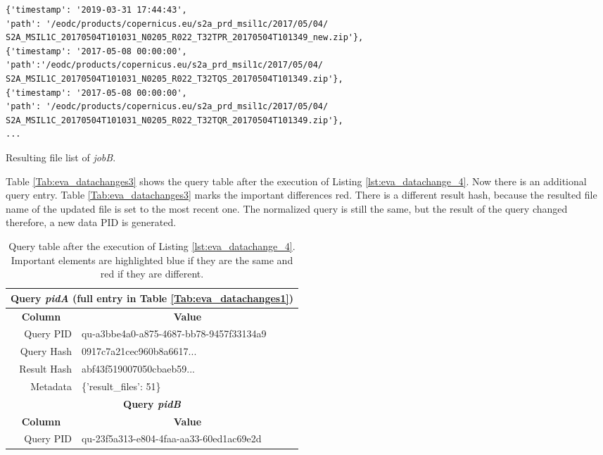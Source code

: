 \documentclass[draft,final]{vutinfth} %
\newenvironment{code}{\captionsetup{type=listing}}{}
\newcommand{\bgoesswein}[1]{{\color{blue}#1}}
\begin{document}
\begin{enumerate}
	\begin{code}
		\begin{verbatim}
{'timestamp': '2019-03-31 17:44:43', 
'path': '/eodc/products/copernicus.eu/s2a_prd_msil1c/2017/05/04/
S2A_MSIL1C_20170504T101031_N0205_R022_T32TPR_20170504T101349_new.zip'}, 
{'timestamp': '2017-05-08 00:00:00',
'path':'/eodc/products/copernicus.eu/s2a_prd_msil1c/2017/05/04/
S2A_MSIL1C_20170504T101031_N0205_R022_T32TQS_20170504T101349.zip'}, 
{'timestamp': '2017-05-08 00:00:00', 
'path': '/eodc/products/copernicus.eu/s2a_prd_msil1c/2017/05/04/
S2A_MSIL1C_20170504T101031_N0205_R022_T32TQR_20170504T101349.zip'}, 
...
		\end{verbatim}
		\caption{Resulting file list of \textit{jobB}.}
		\label{lst:eva_datachange_fl3}
	\end{code}
	\newpage
	Table \ref{Tab:eva_datachanges3} shows the query table after the execution of Listing \ref{lst:eva_datachange_4}. Now there is an additional query entry. Table \ref{Tab:eva_datachanges3} marks the important differences red. There is a different result hash, because the \bgoesswein{resulted file name of the updated file is set to the most recent one}. The normalized query is still the same, but the result of the query changed therefore, a new data PID is generated. 
	\begin{table}[]
		\caption{Query table after the execution of Listing \ref{lst:eva_datachange_4}. Important elements are highlighted blue if they are the same and red if they are different.}
		\centering
		\begin{tabular}{|r|l|}
			\hline \multicolumn{2}{|c|}{\textbf{Query \textit{pidA} (full entry in Table \ref{Tab:eva_datachanges1})}} \\
			\hline \multicolumn{1}{|c|}{\textbf{Column}}  &  \multicolumn{1}{c|}{\textbf{Value}} \\ \hline
			Query PID & {\color{red}qu-a3bbe4a0-a875-4687-bb78-9457f33134a9}  \\ 
			Query Hash & {\color{blue}0917c7a21cec960b8a6617...}  \\
			Result Hash & {\color{red}abf43f519007050cbaeb59...}   \\
			Metadata & \{'result\_files': 51\}  \\
			\hline \multicolumn{2}{|c|}{\textbf{Query \textit{pidB}}} \\
			\hline \multicolumn{1}{|c|}{\textbf{Column}}  &  \multicolumn{1}{c|}{\textbf{Value}} \\ \hline
			Query PID & { \color{red} qu-23f5a313-e804-4faa-aa33-60ed1ac69e2d}  \\ 

\end{tabular}
\end{table}
\end{enumerate}
\end{document}
